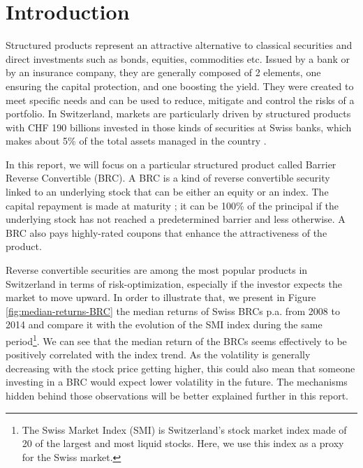 \documentclass[a4paper,11pt,english]{book}
\begin{document}
\pagestyle{empty}
\tableofcontents
\listoffigures
\listoftables

\mainmatter
\chapter*{Introduction}
\vspace*{-2cm}

Structured products represent an attractive alternative to classical securities and direct investments such as bonds, equities, commodities etc. Issued by a bank or by an insurance company, they are generally composed of 2 elements, one ensuring the capital protection, and one boosting the yield. They were created to meet specific needs and can be used to reduce, mitigate and control the risks of a portfolio. In Switzerland, markets are particularly driven by structured products with CHF 190 billions invested in those kinds of securities at Swiss banks, which makes about 5\% of the total assets managed in the country \cite{SSPA}.

In this report, we will focus on a particular structured product called Barrier Reverse Convertible (BRC). A BRC is a kind of reverse convertible security linked to an underlying stock that can be either an equity or an index. The capital repayment is made at maturity ; it can be 100\% of the principal if the underlying stock has not reached a predetermined barrier and less otherwise. A BRC also pays highly-rated coupons that enhance the attractiveness of the product.

Reverse convertible securities are among the most popular products in Switzerland in terms of risk-optimization, especially if the investor expects the market to move upward. In order to illustrate that, we present in Figure \ref{fig:median-returns-BRC} the median returns of Swiss BRCs p.a. from 2008 to 2014 \cite{SSPA-study} and compare it with the evolution of the SMI index during the same period\footnote{The Swiss Market Index (SMI) is Switzerland's stock market index made of 20 of the largest and most liquid stocks. Here, we use this index as a proxy for the Swiss market.}. We can see that the median return of the BRCs seems effectively to be positively correlated with the index trend. As the volatility is generally decreasing with the stock price getting higher, this could also mean that someone investing in a BRC would expect lower volatility in the future. The mechanisms hidden behind those observations will be better explained further in this report.
\end{document}
